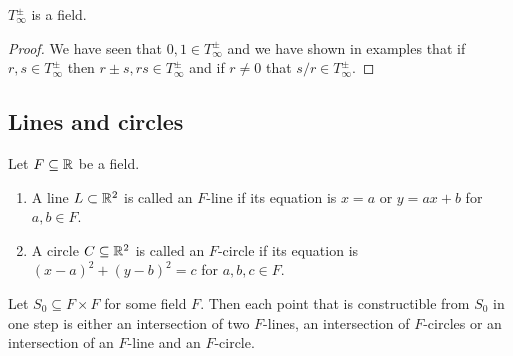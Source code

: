 \documentclass[11pt,a4paper]{article}
\begin{document}
\begin{corollary}
  \label{cor:constructible-numbers-are-a-field}
  $T^{\pm}_{\infty}$ is a field.
\end{corollary}
\begin{proof}
  We have seen that $0,1 \in T_{\infty}^{\pm}$ and we have shown
  in examples
  that if $r,s \in T^{\pm}_{\infty}$ then $r \pm s, rs \in T^{\pm}_{\infty}$
  and if $r \neq 0$ that $s/r \in T^{\pm}_{\infty}$.
\end{proof}

\subsection{Lines and circles}

\begin{definition}
  Let $F \subseteq \mathbb{R}$ be a field.
  \begin{enumerate}
    \item[(1)] A line $L \subset \mathbb{R}^2$ is called an $F$-line if its equation
    is $x = a$ or $y = ax + b$ for $a,b \in F$.
    \item[(2)] A circle $C \subseteq \mathbb{R}^2$ is called an $F$-circle if its
      equation is $(x - a)^2 + (y - b)^2 = c$ for $a,b,c \in F$.
  \end{enumerate}
\end{definition}
\begin{remark}
  Let $S_0 \subseteq F \times F$ for some field $F$.
  Then each point that is constructible from $S_0$ in one step
  is either an intersection of two $F$-lines,
  an intersection of $F$-circles
  or an intersection of an $F$-line and an $F$-circle.
\end{remark}
\end{document}
